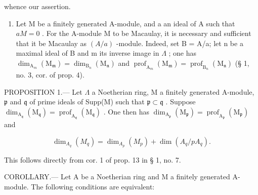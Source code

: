 whence our assertion.

\begin{enumerate}
\def\labelenumi{\arabic{enumi})}
\setcounter{enumi}{3}
\tightlist
\item
  Let M be a finitely generated A-module, and a an ideal of A such that \(aM = 0\) . For the A-module M to be Macaulay, it is necessary and sufficient that it be Macaulay as \((A/a)\) -module. Indeed, set B = A/a; let n be a maximal ideal of B and m its inverse image in \(\Lambda\) ; one has \(\dim_{\mathrm{A}_{m}}(\mathrm{M}_{\mathfrak{m}}) = \dim_{\mathrm{B}_{n}}(\mathrm{M}_{\mathfrak{n}})\) and \(\operatorname{prof}_{\mathrm{A}_{m}}(\mathrm{M}_{\mathfrak{m}}) = \operatorname{prof}_{\mathrm{B}_{n}}(\mathrm{M}_{\mathfrak{n}})\) (§ 1, no. 3, cor. of prop. 4).
\end{enumerate}

PROPOSITION 1.--- Let \(\Lambda\) a Noetherian ring, M a finitely generated A-module, \(\mathfrak{p}\) and \(\mathfrak{q}\) of prime ideals of Supp(M) such that \(\mathfrak{p} \subset \mathfrak{q}\) . Suppose \(\dim_{\mathrm{A}_{\mathfrak{q}}}(\mathrm{M}_{\mathfrak{q}}) = \operatorname{prof}_{\mathrm{A}_{\mathfrak{q}}}(\mathrm{M}_{\mathfrak{q}})\) . One then has \(\dim_{\mathrm{A}_{\mathfrak{p}}}(\mathrm{M}_{\mathfrak{p}}) = \operatorname{prof}_{\mathrm{A}_{\mathfrak{p}}}(\mathrm{M}_{\mathfrak{p}})\) and

\[
\dim_ {A _ {q}} (M _ {q}) = \dim_ {A _ {p}} (M _ {p}) + \dim (A _ {q} / p A _ {q}).
\]

This follows directly from cor. 1 of prop. 13 in § 1, no. 7.

COROLLARY.--- Let A be a Noetherian ring and M a finitely generated A-module. The following conditions are equivalent:

